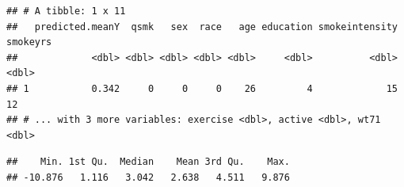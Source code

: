 \documentclass[
  10pt,
]{book}
\newenvironment{Shaded}{\begin{snugshade}}{\end{snugshade}}
\newcommand{\DecValTok}[1]{\textcolor[rgb]{0.00,0.00,0.81}{#1}}
\newcommand{\FunctionTok}[1]{\textcolor[rgb]{0.00,0.00,0.00}{#1}}
\newcommand{\NormalTok}[1]{#1}
\newcommand{\OtherTok}[1]{\textcolor[rgb]{0.56,0.35,0.01}{#1}}
\newcommand{\SpecialCharTok}[1]{\textcolor[rgb]{0.00,0.00,0.00}{#1}}
\newcommand{\StringTok}[1]{\textcolor[rgb]{0.31,0.60,0.02}{#1}}
\begin{document}
\begin{Shaded}
\end{Shaded}

\begin{verbatim}
## # A tibble: 1 x 11
##   predicted.meanY  qsmk   sex  race   age education smokeintensity smokeyrs
##             <dbl> <dbl> <dbl> <dbl> <dbl>     <dbl>          <dbl>    <dbl>
## 1           0.342     0     0     0    26         4             15       12
## # ... with 3 more variables: exercise <dbl>, active <dbl>, wt71 <dbl>
\end{verbatim}

\begin{Shaded}
\end{Shaded}

\begin{verbatim}
##    Min. 1st Qu.  Median    Mean 3rd Qu.    Max. 
## -10.876   1.116   3.042   2.638   4.511   9.876
\end{verbatim}

\begin{Shaded}
\end{Shaded}
\end{document}
